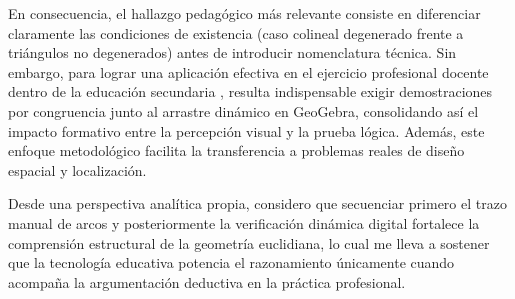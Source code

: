 \documentclass[spanish,letterpaper,oneside]{article}
\begin{document}
En consecuencia, el hallazgo pedagógico más relevante consiste en diferenciar claramente las condiciones de existencia (caso colineal degenerado frente a triángulos no degenerados) antes de introducir nomenclatura técnica. Sin embargo, para lograr una aplicación efectiva en el ejercicio profesional docente dentro de la educación secundaria \citep{sep2024_fase6}, resulta indispensable exigir demostraciones por congruencia junto al arrastre dinámico en GeoGebra, consolidando así el impacto formativo entre la percepción visual y la prueba lógica. Además, este enfoque metodológico facilita la transferencia a problemas reales de diseño espacial y localización.

Desde una perspectiva analítica propia, considero que secuenciar primero el trazo manual de arcos y posteriormente la verificación dinámica digital fortalece la comprensión estructural de la geometría euclidiana, lo cual me lleva a sostener que la tecnología educativa potencia el razonamiento únicamente cuando acompaña la argumentación deductiva en la práctica profesional.

\newsavebox{\hiddenbibbox}
\begin{lrbox}{\hiddenbibbox}\begin{minipage}{\textwidth}\end{minipage}\end{lrbox}
\end{document}
